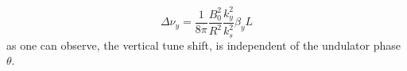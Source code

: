 \documentclass[a4paper,12pt]{article}
\begin{document}
\begin{equation}
    \Delta \nu_y = \frac{1}{8\pi}\frac{B_0^2}{R^2}\frac{k_y^2}{k_s^2}\beta_y L
    \label{eq:vertical_tune_shift}
\end{equation}
as one can observe, the vertical tune shift, is independent of the undulator phase $\theta$.



     \nocite{*}
\end{document}
